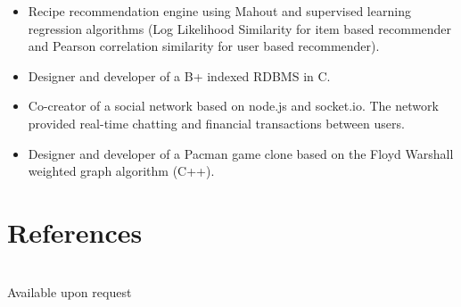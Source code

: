 \documentclass{article}
\begin{document}
\begin{multicols}{2}
\begin{itemize}
				\item Recipe recommendation engine using Mahout and supervised learning regression algorithms (Log Likelihood Similarity for item based recommender and Pearson correlation similarity for user based recommender).
				\item Designer and developer of a B+ indexed RDBMS in C.
				\item Co-creator of a social network based on node.js and socket.io. The network provided real-time chatting and financial transactions between users.
				\item Designer and developer of a Pacman game clone based on the Floyd Warshall weighted graph algorithm (C++).
				
				
			\end{itemize}
	\end{multicols}

	\section*{\color{NavyBlue}References}
	\vspace{-0.5cm}
	{\color{NavyBlue}\hrulefill} \\
	Available upon request
\end{document}
